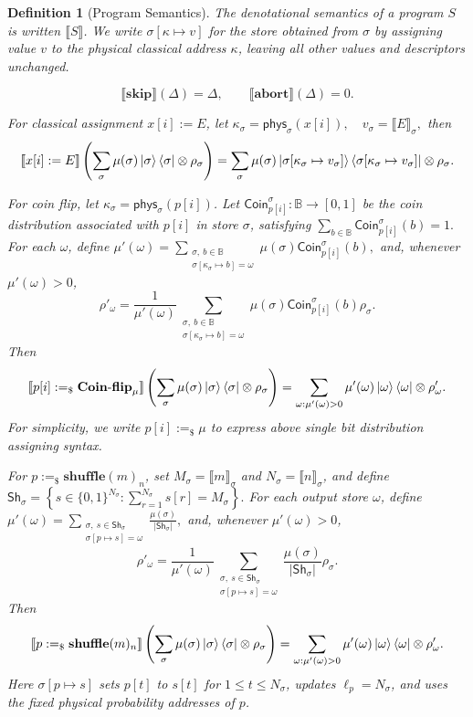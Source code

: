 \documentclass[acmsmall,screen,review,anonymous,nonacm]{acmart}
\newtheorem{definition}{Definition}[section]
\theoremstyle{defn_style}
\begin{document}
\begin{definition}[Program Semantics]
The denotational semantics of a program \(S\) is written
\(\llbracket S\rrbracket\). We write
\(\sigma[\kappa\mapsto v]\) for the store obtained from \(\sigma\) by
assigning value \(v\) to the physical classical address \(\kappa\), leaving all
other values and descriptors unchanged.

\[
\llbracket\mathbf{skip}\rrbracket(\Delta)=\Delta,
\qquad
\llbracket\mathbf{abort}\rrbracket(\Delta)=0.
\]

For classical assignment \(x[i]:=E\), let
\(\kappa_\sigma=\mathsf{phys}_\sigma(x[i]),
\quad
v_\sigma=\llbracket E\rrbracket_\sigma ,\)
then
\[
\llbracket x[i]:=E\rrbracket
\left(
\sum_\sigma\mu(\sigma)\ket{\sigma}\bra{\sigma}\otimes\rho_\sigma
\right)
=
\sum_\sigma
\mu(\sigma)
\ket{\sigma[\kappa_\sigma\mapsto v_\sigma]}
\bra{\sigma[\kappa_\sigma\mapsto v_\sigma]}
\otimes\rho_\sigma .
\]


For coin flip, let \(\kappa_\sigma=\mathsf{phys}_\sigma(p[i])\). Let
\(\mathsf{Coin}_{p[i]}^\sigma:\mathbb B\to[0,1]\) be the coin distribution
associated with \(p[i]\) in store \(\sigma\), satisfying
\(\sum_{b\in\mathbb B}\mathsf{Coin}_{p[i]}^\sigma(b)=1.\)
For each \(\omega\), define
\(\mu'(\omega)
=
\sum_{\substack{\sigma,\ b\in\mathbb B\\
\sigma[\kappa_\sigma\mapsto b]=\omega}}
\mu(\sigma)\mathsf{Coin}_{p[i]}^\sigma(b),\)
and, whenever \(\mu'(\omega)>0\),
\[
\rho'_\omega
=
\frac{1}{\mu'(\omega)}
\sum_{\substack{\sigma,\ b\in\mathbb B\\
\sigma[\kappa_\sigma\mapsto b]=\omega}}
\mu(\sigma)\mathsf{Coin}_{p[i]}^\sigma(b)\rho_\sigma .
\]
Then
\[
\llbracket p[i]:=_\$ \mathbf{Coin\mbox{-}flip}_{\mu}\rrbracket
\left(
\sum_\sigma\mu(\sigma)\ket{\sigma}\bra{\sigma}\otimes\rho_\sigma
\right)
=
\sum_{\omega:\mu'(\omega)>0}
\mu'(\omega)\ket{\omega}\bra{\omega}\otimes\rho'_\omega .
\]
For simplicity, we write $p[i]:=_{\$}\mu$ to express above single bit distribution assigning syntax.


For \(p:=_\$\mathbf{shuffle}(m)_n\), set
\(M_\sigma=\llbracket m\rrbracket_\sigma\) and
\(N_\sigma=\llbracket n\rrbracket_\sigma\), and define
\(\mathsf{Sh}_\sigma
=
\left\{
s\in\{0,1\}^{N_\sigma}:
\sum_{r=1}^{N_\sigma}s[r]=M_\sigma
\right\}.\)
For each output store \(\omega\), define
\(\mu'(\omega)
=
\sum_{\substack{\sigma,\ s\in\mathsf{Sh}_\sigma\\
\sigma[p\mapsto s]=\omega}}
\frac{\mu(\sigma)}{|\mathsf{Sh}_\sigma|},\)
and, whenever \(\mu'(\omega)>0\),
\[
\rho'_\omega
=
\frac{1}{\mu'(\omega)}
\sum_{\substack{\sigma,\ s\in\mathsf{Sh}_\sigma\\
\sigma[p\mapsto s]=\omega}}
\frac{\mu(\sigma)}{|\mathsf{Sh}_\sigma|}\rho_\sigma .
\]
Then
\[
\llbracket p:=_\$\mathbf{shuffle}(m)_n\rrbracket
\left(
\sum_\sigma\mu(\sigma)\ket{\sigma}\bra{\sigma}\otimes\rho_\sigma
\right)
=
\sum_{\omega:\mu'(\omega)>0}
\mu'(\omega)\ket{\omega}\bra{\omega}\otimes\rho'_\omega .
\]
Here \(\sigma[p\mapsto s]\) sets \(p[t]\) to \(s[t]\) for
\(1\le t\le N_\sigma\), updates \(\ell_p=N_\sigma\), and uses the fixed
physical probability addresses of \(p\).


\end{definition}
\end{document}
